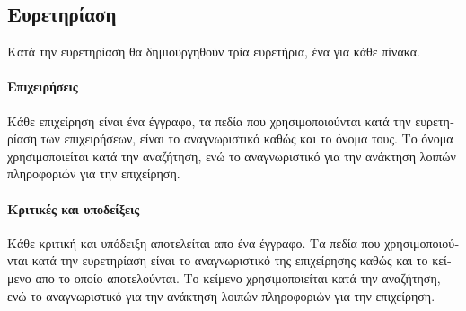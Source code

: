 \newpage
\subsection{\textgreek{Ευρετηρίαση}}

\textgreek{
    Κατά την ευρετηρίαση θα δημιουργηθούν τρία ευρετήρια, ένα για κάθε πίνακα.
}

\paragraph{\textgreek{Επιχειρήσεις}} {
    \textgreek{
        Κάθε επιχείρηση είναι ένα έγγραφο, τα πεδία που χρησιμοποιούνται
        κατά την ευρετηρίαση των επιχειρήσεων, είναι το αναγνωριστικό καθώς
        και το όνομα τους. Το όνομα χρησιμοποιείται κατά την αναζήτηση, ενώ
        το αναγνωριστικό για την ανάκτηση λοιπών πληροφοριών για την επιχείρηση.
    }
}

\paragraph{\textgreek{Κριτικές και υποδείξεις}} {
    \textgreek{
        Κάθε κριτική και υπόδειξη αποτελείται απο ένα έγγραφο. Τα πεδία
        που χρησιμοποιούνται κατά την ευρετηρίαση είναι το αναγνωριστικό 
        της επιχείρησης καθώς και το κείμενο απο το οποίο αποτελούνται.
        Το κείμενο χρησιμοποιείται κατά την αναζήτηση, ενώ το
        αναγνωριστικό για την ανάκτηση λοιπών πληροφοριών για την επιχείρηση.
    }
}
